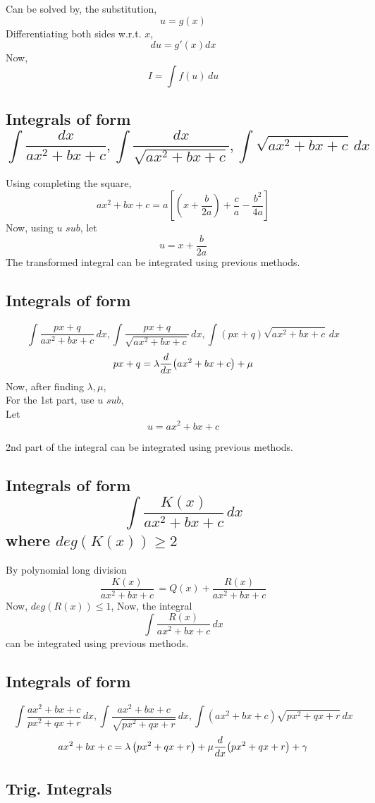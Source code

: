 \documentclass{article}
\begin{document}
Can be solved by, the substitution,
$$u=g(x)$$ Differentiating both sides w.r.t. $x$,
$$du=g'(x)dx$$
Now, $$I=\int f(u) \, du$$
\subsection{Integrals of form $$\int \dfrac{dx}{ax^2+bx+c}, \int \dfrac{dx}{\sqrt{ax^2+bx+c}}, \int \sqrt{ax^2+bx+c} \, dx$$}
Using completing the square, $$ax^2+bx+c=a \left[\left(x+\dfrac{b}{2a}\right)+\dfrac{c}{a}-\dfrac{b^2}{4a}\right]$$
Now, using $\textit{u sub}$, let $$u=x+\dfrac{b}{2a}$$ 
The transformed integral can be integrated using previous methods.

\subsection{Integrals of form}
$$\int \dfrac{px+q}{ax^2+bx+c} \, dx, \int \dfrac{px+q}{\sqrt{ax^2+bx+c}} \, dx, \int \left(px+q\right)\sqrt{ax^2+bx+c} \, dx $$
$$px+q=\lambda \dv{x}(ax^2+bx+c) +\mu$$
Now, after finding $\lambda
, \mu$, \\For the 1st part, use $\textit{u sub}$,\\ Let $$u= ax^2+bx+c$$ 

2nd part of the integral can be integrated using previous methods.
\subsection{Integrals of form $$\int \dfrac{K(x)}{ax^2+bx+c} \, dx$$ where $deg(K(x))\ge2$}

By polynomial long division $$\dfrac{K(x)}{ax^2+bx+c} \,=Q(x) + \dfrac{R(x)}{ax^2+bx+c}$$
Now, $deg(R(x))\le 1$, Now, the integral $$\int \dfrac{R(x)}{ax^2+bx+c} \, dx$$
can be integrated using previous methods.

\subsection{Integrals of form}
$$\int \dfrac{ax^2+bx+c}{px^2+qx+r} \, dx, \int \dfrac{ax^2+bx+c}{\sqrt{px^2+qx+r}} \, dx, \int \left(ax^2+bx+c\right)\sqrt{px^2+qx+r} \, dx$$
$$ax^2+bx+c= \lambda \left(px^2+qx+r\right)+\mu \dv{x}(px^2+qx+r)+\gamma$$
\subsection{Trig. Integrals}
\end{document}
